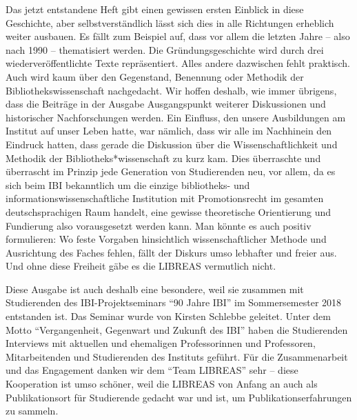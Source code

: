 \documentclass[a4paper,
fontsize=11pt,
oneside,
numbers=noperiodatend,
parskip=half-,
bibliography=totoc,
final
]{scrartcl}
\begin{document}
Das jetzt entstandene Heft gibt einen gewissen ersten Einblick in diese
Geschichte, aber selbstverständlich lässt sich dies in alle Richtungen
erheblich weiter ausbauen. Es fällt zum Beispiel auf, dass vor allem die
letzten Jahre -- also nach 1990 -- thematisiert werden. Die
Gründungsgeschichte wird durch drei wiederveröffentlichte Texte
repräsentiert. Alles andere dazwischen fehlt praktisch. Auch wird kaum
über den Gegenstand, Benennung oder Methodik der Bibliothekswissenschaft
nachgedacht. Wir hoffen deshalb, wie immer übrigens, dass die Beiträge
in der Ausgabe Ausgangspunkt weiterer Diskussionen und historischer
Nachforschungen werden. Ein Einfluss, den unsere Ausbildungen am
Institut auf unser Leben hatte, war nämlich, dass wir alle im Nachhinein
den Eindruck hatten, dass gerade die Diskussion über die
Wissenschaftlichkeit und Methodik der Bibliotheks*wissenschaft zu kurz
kam. Dies überraschte und überrascht im Prinzip jede Generation von
Studierenden neu, vor allem, da es sich beim IBI bekanntlich um die
einzige bibliotheks- und informationswissenschaftliche Institution mit
Promotionsrecht im gesamten deutschsprachigen Raum handelt, eine gewisse
theoretische Orientierung und Fundierung also vorausgesetzt werden kann.
Man könnte es auch positiv formulieren: Wo feste Vorgaben hinsichtlich
wissenschaftlicher Methode und Ausrichtung des Faches fehlen, fällt der
Diskurs umso lebhafter und freier aus. Und ohne diese Freiheit gäbe es
die LIBREAS vermutlich nicht.

Diese Ausgabe ist auch deshalb eine besondere, weil sie zusammen mit
Studierenden des IBI-Projektseminars \enquote{90 Jahre IBI} im
Sommersemester 2018 entstanden ist. Das Seminar wurde von Kirsten
Schlebbe geleitet. Unter dem Motto \enquote{Vergangenheit, Gegenwart und
Zukunft des IBI} haben die Studierenden Interviews mit aktuellen und
ehemaligen Professorinnen und Professoren, Mitarbeitenden und
Studierenden des Instituts geführt. Für die Zusammenarbeit und das
Engagement danken wir dem \enquote{Team LIBREAS} sehr -- diese
Kooperation ist umso schöner, weil die LIBREAS von Anfang an auch als
Publikationsort für Studierende gedacht war und ist, um
Publikationserfahrungen zu sammeln.
\end{document}
